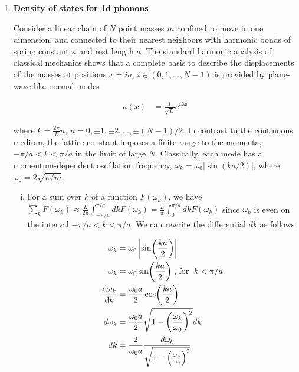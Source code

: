 \documentclass[]{article}
\begin{document}
\begin{enumerate}[1.]
\begin{enumerate}[i.]
\end{enumerate}

\hfill \\
\noindent\rule{15cm}{0.4pt} \\

\item {\bf Density of states for 1d phonons}

Consider a linear chain of $N$ point masses $m$ confined to move in one dimension, and connected to their nearest neighbors with harmonic bonds of spring constant $\kappa$ and rest length $a$. The standard harmonic analysis of classical mechanics shows that a complete basis to describe the displacements of the masses at positions $x = ia$, $i \in (0,1, \dots, N-1)$ is provided by plane-wave-like normal modes

\begin{equation}
\begin{split}
u(x) & = \frac{1}{\sqrt{L}} e^{ikx}
\end{split}
\end{equation}

where $k = \frac{2\pi}{L}n$, $n = 0, \pm1, \pm2, \dots , \pm (N-1)/2$. In contrast to the continuous medium, the lattice constant imposes a finite range to the momenta, $-\pi/a<k<\pi/a$ in the limit of large $N$. Classically, each mode has a momentum-dependent oscillation frequency, $\omega_k = \omega_0 | \sin(ka/2) |$, where $\omega_0 = 2\sqrt{\kappa/m}$.


\begin{enumerate}[i.]

\item For a sum over $k$ of a function $F(\omega_k)$, we have $\sum_k F(\omega_k) \approx \frac{L}{2\pi} \int_{-\pi/a}^{\pi/a} dk F(\omega_k) = \frac{L}{\pi} \int_{0}^{\pi/a} dk F(\omega_k) $ since $\omega_k$ is even on the interval $-\pi/a< k < \pi/a$. We can rewrite the differential $dk$ as follows 

\begin{equation}
\begin{split}
\omega_k & = \omega_0 \left| \sin(\frac{ka}{2}) \right| \\
\omega_k & = \omega_0 \sin(\frac{ka}{2})  \; \text{, for } \;  k < \pi/a \\
\dv{\omega_k }{k} & =  \frac{\omega_0a}{2} \cos(\frac{ka}{2}) \\
d\omega_k & = \frac{\omega_0a}{2}  \sqrt{1  -  \left( \frac{\omega_k }{\omega_0} \right)^2} dk  \\
dk & = \frac{2}{\omega_0a} \frac{d\omega_k }{ \sqrt{1  -  \left( \frac{\omega_k }{\omega_0} \right)^2}  }
\end{split}
\end{equation}


\end{enumerate}
\end{enumerate}
\end{document}
